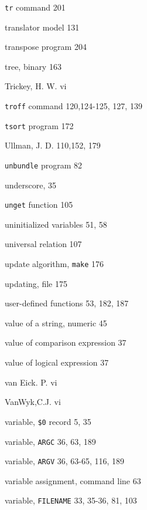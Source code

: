 \begin{multicols}{3}
\hangindent=4pc  \verb'tr' command 201

\hangindent=4pc  translator model 131

\hangindent=4pc  transpose program 204

\hangindent=4pc  tree, binary 163

\hangindent=4pc  Trickey, H. W. vi

\hangindent=4pc  \verb'troff' command 120,124-125, 127, 139

\hangindent=4pc  \verb'tsort' program 172





\hangindent=4pc  Ullman, J. D. 110,152, 179

\hangindent=4pc  \verb'unbundle' program 82

\hangindent=4pc  underscore, 35

\hangindent=4pc  \verb'unget' function 105

\hangindent=4pc  uninitialized variables 51, 58

\hangindent=4pc  universal relation 107

\hangindent=4pc  update algorithm, \verb'make' 176

\hangindent=4pc  updating, file 175

\hangindent=4pc  user-defined functions 53, 182,  187

\hangindent=4pc  value of a string, numeric 45

\hangindent=4pc  value of comparison expression 37

\hangindent=4pc  value of logical expression 37

\hangindent=4pc  van Eick. P. vi

\hangindent=4pc  VanWyk,C.J. vi

\hangindent=4pc  variable, \verb'$0' record 5, 35

\hangindent=4pc  variable, \verb'ARGC' 36, 63, 189

\hangindent=4pc  variable, \verb'ARGV' 36, 63-65, 116, 189

\hangindent=4pc  variable assignment, command line 63

\hangindent=4pc  variable, \verb'FILENAME' 33, 35-36, 81, 103


\end{multicols}
